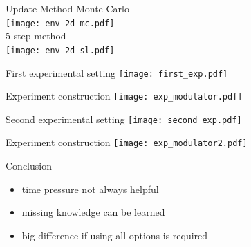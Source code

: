 \documentclass[hyperref={pdfpagelabels=false}]{beamer}
\begin{document}
\begin{frame}{Update Method}
Monte Carlo\\
\vspace{1em}
\texttt{[image: env\_2d\_mc.pdf]} \\ \pause
\vspace{1em}
5-step method\\
\vspace{1em}
\texttt{[image: env\_2d\_sl.pdf]}
\end{frame}

\begin{frame}{First experimental setting}
\texttt{[image: first\_exp.pdf]}
\end{frame}

\begin{frame}{Experiment construction}
\texttt{[image: exp\_modulator.pdf]}
\end{frame}

\begin{frame}{Second experimental setting}
\texttt{[image: second\_exp.pdf]}
\end{frame}

\begin{frame}{Experiment construction}
\texttt{[image: exp\_modulator2.pdf]}
\end{frame}


\begin{frame}{Conclusion}
\begin{itemize}
\item time pressure not always helpful \pause
\item missing knowledge can be learned \pause
\item big difference if using all options is required
\end{itemize}
\end{frame}
\end{document}
